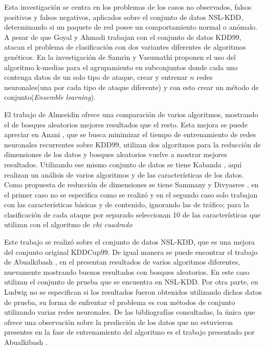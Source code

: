 Esta investigación se centra en los problemas de los casos no observados, falsos positivos y falsos negativos, aplicados sobre el conjunto de datos NSL-KDD, determinando si un paquete de red posee un comportamiento normal o anómalo. A pesar de que Goyal y Ahmadi \cite{goyal2008ga,ahmadi2009intrusion} trabajan con el conjunto de datos KDD99, atacan el problema de clasificación con dos variantes diferentes de algoritmos genéticos. En la investigación de Samrin y Vasumathi \cite{samrin2018hybrid} proponen el uso del algoritmo k-medias para el agrupamiento en subconjuntos donde cada uno contenga datos de un solo tipo de ataque, crear y entrenar $n$ redes neuronales(una por cada tipo de ataque diferente) y con esto crear un método de conjunto(\textit{Ensemble learning}). 

El trabajo de Almseidin \cite{almseidin2017evaluation} ofrece una comparación de varios algoritmos, mostrando el de bosques aleatorios mejores resultados que el resto. Esta mejora se puede apreciar en Anani \cite{anani2018recurrent}, que se busca minimizar el tiempo de entrenamiento de redes neuronales recurrentes sobre KDD99, utilizan dos algoritmos para la reducción de dimensiones de los datos y bosques aleatorios vuelve a mostrar mejores resultados. Utilizando ese mismo conjunto de datos se tiene Kabanda \cite{kabanda2019bayesian}, aquí realizan un análisis de varios algoritmos y de las características de los datos. Como propuesta de reducción de dimensiones se tiene Sammany y Divyasree \cite{sammany2007artificial,divyasree2018network}, en el primer caso no se especifica como se realizó y en el segundo caso solo trabajan con las características básicas y de contenido, ignorando las de tráfico; para la clasificación de cada ataque por separado seleccionan 10 de las características que utilizan con el algoritmo de \textit{chi cuadrado}

Este trabajo se realizó sobre el conjunto de datos NSL-KDD, que es una mejora del conjunto original KDDCup99. De igual manera se puede encontrar el trabajo de Abualkibash \cite{abualkibash2019machine}, en el presentan resultados de varios algoritmos diferentes, nuevamente mostrando buenos resultados con bosques aleatorios. En este caso utilizan el conjunto de prueba que se encuentra en NSL-KDD. Por otra parte, en Ludwig \cite{ludwig2019applying} no se especifican si los resultados fueron obtenidos utilizando dichos datos de prueba, su forma de enfrentar el problema es con métodos de conjunto utilizando varias redes neuronales. De las bibliografías consultadas, la única que ofrece una observación sobre la predicción de los datos que no estuvieron presentes en la fase de entrenamiento del algoritmo es el trabajo presentado por Abualkibash \cite{abualkibash2019machine}.

